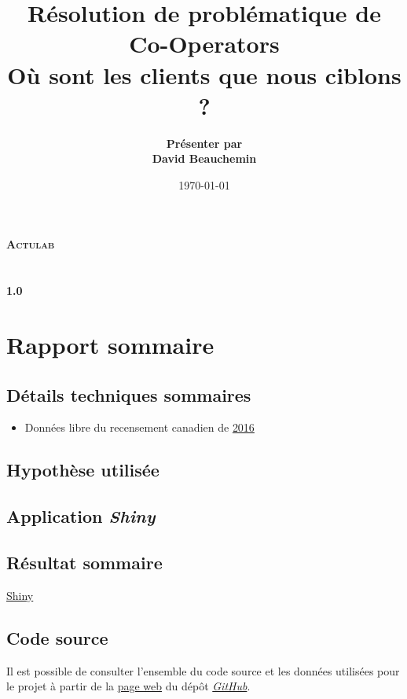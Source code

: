 \documentclass[11pt,french]{report}\usepackage[]{graphicx}\usepackage[]{color}
\title{Résolution de problématique de \\ Co-Operators \\ \bigskip Où sont les clients que nous ciblons ?}
\author{\textbf{Présenter par \\ David Beauchemin}}
\date{\today}
\def\versionnumber{1.0}
\begin{document}
\makeatletter
  \begin{titlepage}
  \centering
      {\LARGE \textbf{\textsc{Actulab}}}\\
    \vspace{2cm}
    \vspace{2cm}
      {\LARGE \textbf{\@title}} \\
    \vspace{2cm}
    \vfill
       {\Large \@author} \\
    \vspace{8cm}
        {\large\textbf{\versionnumber}}\\
    \vfill
  \end{titlepage}
\makeatother


\pagebreak




\tableofcontents

\newpage

\chapter*{Rapport sommaire}

\section*{Détails techniques sommaires}
\begin{itemize}
\item Données libre du recensement canadien de \href{http://www12.statcan.gc.ca/census-recensement/2016/dp-pd/prof/details/download-telecharger/comp/page_dl-tc.cfm?Lang=F}{2016}  
\end{itemize}
\section*{Hypothèse utilisée}

\section*{Application \emph{Shiny}}

\section*{Résultat sommaire}
\href{https://davebulaval.shinyapps.io/personnasIdentificateur/}{Shiny}
\section*{Code source}
Il est possible de consulter l'ensemble du code source et les données utilisées pour le projet à partir de la \href{https://davebulaval.github.io/Actulab_COOP/}{page web} du dépôt \href{https://github.com/davebulaval/Actulab_COOP}{\emph{GitHub}}.
\end{document}
